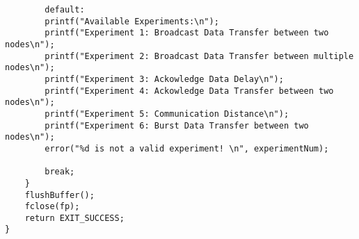 \begin{verbatim}
		default:
		printf("Available Experiments:\n");
		printf("Experiment 1: Broadcast Data Transfer between two nodes\n");
		printf("Experiment 2: Broadcast Data Transfer between multiple nodes\n");
		printf("Experiment 3: Ackowledge Data Delay\n");
		printf("Experiment 4: Ackowledge Data Transfer between two nodes\n");
		printf("Experiment 5: Communication Distance\n");
		printf("Experiment 6: Burst Data Transfer between two nodes\n");
		error("%d is not a valid experiment! \n", experimentNum);
		
		break;
	}
	flushBuffer();
	fclose(fp);
	return EXIT_SUCCESS;
}

\end{verbatim}